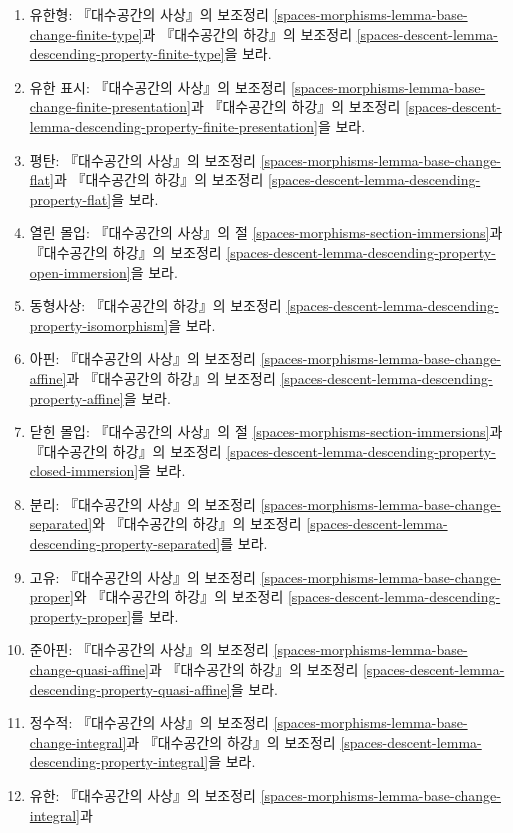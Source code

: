 \begin{enumerate}
\item 유한형: 『대수공간의 사상』의 보조정리
\ref{spaces-morphisms-lemma-base-change-finite-type}과
『대수공간의 하강』의 보조정리
\ref{spaces-descent-lemma-descending-property-finite-type}을 보라.
\item 유한 표시: 『대수공간의 사상』의 보조정리
\ref{spaces-morphisms-lemma-base-change-finite-presentation}과
『대수공간의 하강』의 보조정리
\ref{spaces-descent-lemma-descending-property-finite-presentation}을 보라.
\item 평탄: 『대수공간의 사상』의 보조정리
\ref{spaces-morphisms-lemma-base-change-flat}과
『대수공간의 하강』의 보조정리
\ref{spaces-descent-lemma-descending-property-flat}을 보라.
\item 열린 몰입: 『대수공간의 사상』의 절
\ref{spaces-morphisms-section-immersions}과
『대수공간의 하강』의 보조정리
\ref{spaces-descent-lemma-descending-property-open-immersion}을 보라.
\item 동형사상: 『대수공간의 하강』의 보조정리
\ref{spaces-descent-lemma-descending-property-isomorphism}을 보라.
\item 아핀: 『대수공간의 사상』의 보조정리
\ref{spaces-morphisms-lemma-base-change-affine}과
『대수공간의 하강』의 보조정리
\ref{spaces-descent-lemma-descending-property-affine}을 보라.
\item 닫힌 몰입: 『대수공간의 사상』의 절
\ref{spaces-morphisms-section-immersions}과
『대수공간의 하강』의 보조정리
\ref{spaces-descent-lemma-descending-property-closed-immersion}을 보라.
\item 분리: 『대수공간의 사상』의 보조정리
\ref{spaces-morphisms-lemma-base-change-separated}와
『대수공간의 하강』의 보조정리
\ref{spaces-descent-lemma-descending-property-separated}를 보라.
\item 고유: 『대수공간의 사상』의 보조정리
\ref{spaces-morphisms-lemma-base-change-proper}와
『대수공간의 하강』의 보조정리
\ref{spaces-descent-lemma-descending-property-proper}를 보라.
\item 준아핀: 『대수공간의 사상』의 보조정리
\ref{spaces-morphisms-lemma-base-change-quasi-affine}과
『대수공간의 하강』의 보조정리
\ref{spaces-descent-lemma-descending-property-quasi-affine}을 보라.
\item 정수적: 『대수공간의 사상』의 보조정리
\ref{spaces-morphisms-lemma-base-change-integral}과
『대수공간의 하강』의 보조정리
\ref{spaces-descent-lemma-descending-property-integral}을 보라.
\item 유한: 『대수공간의 사상』의 보조정리
\ref{spaces-morphisms-lemma-base-change-integral}과

\end{enumerate}
